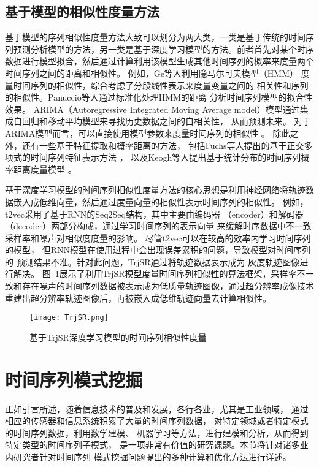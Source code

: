 \subsection{基于模型的相似性度量方法}
基于模型的序列相似性度量方法大致可以划分为两大类，一类是基于传统的时间序列预测分析模型的方法，另一类是基于深度学习模型的方法。前者首先对某个时序数据进行模型拟合，然后通过计算利用该模型生成其他时间序列的概率来度量两个时间序列之间的距离和相似性。
例如，Ge等人利用隐马尔可夫模型（HMM）\cite{DBLP:conf/kdd/GeS00}
度量时间序列的相似性，综合考虑了分段线性表示来度量变量之间的
相关性和序列的相似性。Panuccio等人通过标准化处理HMM的距离
分析时间序列模型的拟合性效果\cite{DBLP:conf/sspr/PanuccioBM02}。
ARIMA（Autoregressive Integrated Moving Average model）模型通过集成自回归和移动平均模型来寻找历史数据之间的自相关性，
从而预测未来\cite{DBLP:conf/aaai/LiuHZS16}。
对于ARIMA模型而言，可以直接使用模型参数来度量时间序列的相似性
\cite{DBLP:conf/icdm/KalpakisGP01}。
除此之外，还有一些基于特征提取和概率距离的方法，
包括Fuchs等人提出的基于正交多项式的时间序列特征表示方法
\cite{DBLP:journals/ijon/FuchsGPS10}，
以及Keogh等人提出基于统计分布的时间序列概率距离度量模型
\cite{DBLP:conf/kdd/KeoghS97}。

基于深度学习模型的时间序列相似性度量方法的核心思想是利用神经网络将轨迹数据嵌入成低维向量，然后通过度量向量的相似性表示时间序列的相似性。
例如，t2vec采用了基于RNN的Seq2Seq结构，其中主要由编码器
（encoder）和解码器（decoder）两部分构成，通过学习时间序列的表示向量
来缓解时序数据中不一致采样率和噪声对相似度度量的影响\cite{DBLP:conf/icde/LiZCJW18}。
尽管t2vec可以在较高的效率内学习时间序列的模型，
但RNN模型在使用过程中会出现误差累积的问题，导致模型对时间序列的
预测结果不准。针对此问题，TrjSR通过将轨迹数据表示成为
灰度轨迹图像进行解决\cite{DBLP:conf/ijcnn/CaoTWWX21}。
图~\ref{fig:TrjSR}展示了利用TrjSR模型度量时间序列相似性的算法框架，采样率不一致和存在噪声的时间序列数据被表示成为低质量轨迹图像，通过超分辨率成像技术重建出超分辨率轨迹图像后，再被嵌入成低维轨迹向量去计算相似性。
\begin{figure}
  \centering
  \texttt{[image: TrjSR.png]}
  \caption{基于TrjSR深度学习模型的时间序列相似性度量}
  \label{fig:TrjSR}
\end{figure}

\section{时间序列模式挖掘}
正如引言所述，随着信息技术的普及和发展，各行各业，尤其是工业领域，
通过相应的传感器和信息系统积累了大量的时间序列数据，
对特定领域或者特定模式的时间序列数据，利用数学建模、
机器学习等方法，进行建模和分析，从而得到特定类型的时间序列子模式，
是一项非常有价值的研究课题。本节将针对诸多业内研究者针对时间序列
模式挖掘问题提出的多种计算和优化方法进行详述。

